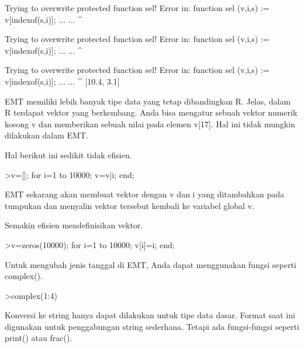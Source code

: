 \documentclass[a4paper,10pt]{article}
\begin{document}
\begin{eulernotebook}
\begin{eulercomment}
\begin{eulercomment}
\begin{eulercomment}
\begin{eulercomment}
\begin{euleroutput}
  Trying to overwrite protected function sel!
  Error in:
  function sel (v,i,s) := v[indexof(s,i)]; ... ...
               ^
  
  Trying to overwrite protected function sel!
  Error in:
  function sel (v,i,s) := v[indexof(s,i)]; ... ...
               ^
  
  Trying to overwrite protected function sel!
  Error in:
  function sel (v,i,s) := v[indexof(s,i)]; ... ...
               ^
  [10.4,  3.1]
\end{euleroutput}
\begin{eulercomment}
EMT memiliki lebih banyak tipe data yang tetap dibandingkan R. Jelas,
dalam R terdapat vektor yang berkembang. Anda bisa mengatur sebuah
vektor numerik kosong v dan memberikan sebuah nilai pada elemen v[17].
Hal ini tidak mungkin dilakukan dalam EMT.

Hal berikut ini sedikit tidak efisien.
\end{eulercomment}
\begin{eulerprompt}
>v=[]; for i=1 to 10000; v=v|i; end;
\end{eulerprompt}
\begin{eulercomment}
EMT sekarang akan membuat vektor dengan v dan i yang ditambahkan pada
tumpukan dan menyalin vektor tersebut kembali ke variabel global v.

Semakin efisien mendefinisikan vektor.
\end{eulercomment}
\begin{eulerprompt}
>v=zeros(10000); for i=1 to 10000; v[i]=i; end;
\end{eulerprompt}
\begin{eulercomment}
Untuk mengubah jenis tanggal di EMT, Anda dapat menggunakan fungsi
seperti complex().
\end{eulercomment}
\begin{eulerprompt}
>complex(1:4)
\end{eulerprompt}
\begin{euleroutput}
  [ 1+0i ,  2+0i ,  3+0i ,  4+0i  ]
\end{euleroutput}
\begin{eulercomment}
Konversi ke string hanya dapat dilakukan untuk tipe data dasar. Format
saat ini digunakan untuk penggabungan string sederhana. Tetapi ada
fungsi-fungsi seperti print() atau frac().


\end{eulercomment}
\end{eulercomment}
\end{eulercomment}
\end{eulercomment}
\end{eulercomment}
\end{eulernotebook}
\end{document}
